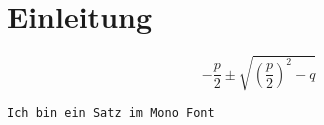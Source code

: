 \documentclass[parskip=half,fontsize=12pt,ngerman]{scrartcl}
\begin{document}
\section{Einleitung}

\blindtext[3]

\[
- \frac{p}{2} \pm \sqrt{ \left( \frac{p}{2}\right)^2 -q  }
\]

\texttt{Ich bin ein Satz im Mono Font}
\end{document}
